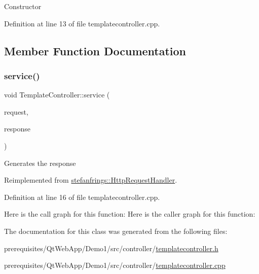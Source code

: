Constructor 

Definition at line 13 of file templatecontroller.\+cpp.



\subsection{Member Function Documentation}
\mbox{\label{class_template_controller_ad34c48cf60094e0deb73aa7145e93eac}} 
\subsubsection{\texorpdfstring{service()}{service()}}
{\footnotesize\ttfamily void Template\+Controller\+::service (\begin{DoxyParamCaption}\item[{\mbox{\hyperlink{classstefanfrings_1_1_http_request}{Http\+Request}} \&}]{request,  }\item[{\mbox{\hyperlink{classstefanfrings_1_1_http_response}{Http\+Response}} \&}]{response }\end{DoxyParamCaption})\hspace{0.3cm}{\ttfamily [virtual]}}

Generates the response 

Reimplemented from \mbox{\hyperlink{classstefanfrings_1_1_http_request_handler_a0a7210907152c46b8b5a47feb64cf6bd}{stefanfrings\+::\+Http\+Request\+Handler}}.



Definition at line 16 of file templatecontroller.\+cpp.

Here is the call graph for this function\+:
Here is the caller graph for this function\+:


The documentation for this class was generated from the following files\+:\begin{DoxyCompactItemize}
\item 
prerequisites/\+Qt\+Web\+App/\+Demo1/src/controller/\mbox{\hyperlink{templatecontroller_8h}{templatecontroller.\+h}}\item 
prerequisites/\+Qt\+Web\+App/\+Demo1/src/controller/\mbox{\hyperlink{templatecontroller_8cpp}{templatecontroller.\+cpp}}\end{DoxyCompactItemize}

